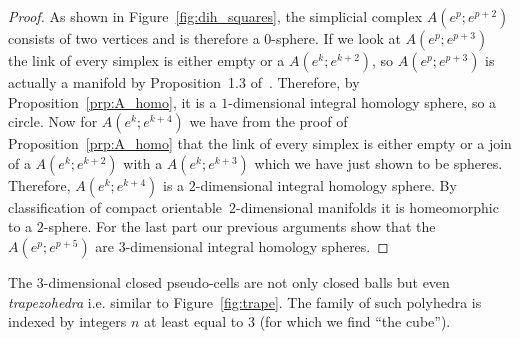 \documentclass[AHL,Unicode,longabstracts,published]{cedram}
\begin{document}
\begin{proof}
As shown in Figure~\ref{fig:dih_squares}, the simplicial complex $A(e^p;e^{p+2})$ consists of two vertices and is therefore a $0$-sphere. If we look at $A(e^p;e^{p+3})$ the link of every simplex is either empty or a $A(e^k;e^{k+2})$, so $A(e^p;e^{p+3})$ is actually a manifold by Proposition~{1.3} of~\cite[Proposition~1.3 p.~5]{Gal-Ste_Cla_Sim}.
Therefore, by Proposition~\ref{prp:A_homo}, it is a $1$-dimensional integral homology sphere, so a circle. Now for $A(e^k;e^{k+4})$ we have from the proof of Proposition~\ref{prp:A_homo} that the link of every simplex is either empty or a join of a $A(e^k;e^{k+2})$ with a $A(e^k;e^{k+3})$ which we have just shown to be spheres. Therefore, $A(e^k;e^{k+4})$ is a $2$-dimensional integral homology sphere. By classification of compact orientable~$2$-dimensional manifolds it is homeomorphic to a $2$-sphere. For the last part our previous arguments show that the $A(e^p;e^{p+5})$ are $3$-dimensional integral homology spheres.
\end{proof}

\begin{rema}
The $3$-dimensional closed pseudo-cells are not only closed balls but even \emph{trapezohedra} i.e. similar to Figure~\ref{fig:trape}. The family of such polyhedra is indexed by integers $n$ at least equal to $3$ (for which we find ``the cube'').
\end{rema}
\end{document}
